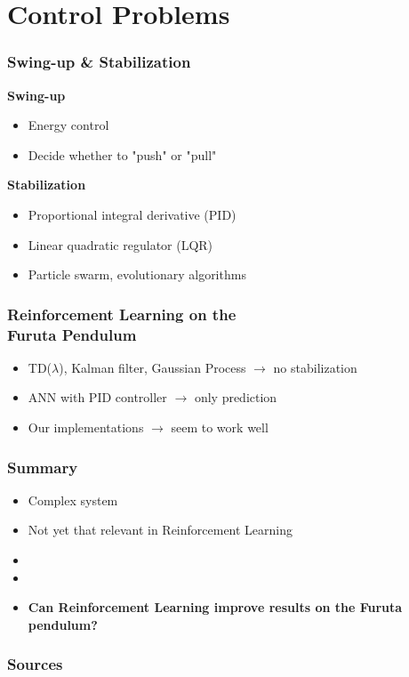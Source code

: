 \documentclass[accentcolor=tud1d,colorbacktitle,inverttitle,landscape,german,presentation,t]{tudbeamer}
\begin{document}
\section{Control Problems}
\begin{frame}[t]
	\frametitle{Swing-up \& Stabilization}
	\begin{minipage}[t]{0.48\textwidth}
	\textbf{Swing-up}
	\begin{itemize}
		\item Energy control 
		\item Decide whether to "push" or "pull"
	\end{itemize}
	\end{minipage}
\hfill
	\begin{minipage}[t]{0.48\textwidth}
		\textbf{Stabilization}
		\begin{itemize}
		\item Proportional integral derivative (PID)
		\item Linear quadratic regulator (LQR)
		\item Particle swarm, evolutionary algorithms
		\end{itemize}
	\end{minipage}
\end{frame}
\begin{frame}[t]
	\frametitle{Reinforcement Learning on the\\ Furuta Pendulum}
	\begin{itemize}
	\item TD($\lambda$), Kalman filter, Gaussian Process $\rightarrow$ no 
	stabilization
	\item ANN with PID controller $\rightarrow$ only prediction
	\item Our implementations $\rightarrow$ seem to work well
	\end{itemize}
\end{frame}

\begin{frame}[c]
	\frametitle{Summary}
	\begin{itemize}
		\item Complex system
		\item Not yet that relevant in Reinforcement Learning
		\item[ ]
		\item[ ]
		\item[ ] 	\textbf{Can Reinforcement Learning improve results on the 
		Furuta 
		pendulum?}
	\end{itemize}



\end{frame}
\begin{frame}
	\frametitle{Sources}
	
	 
\end{frame}
\end{document}

